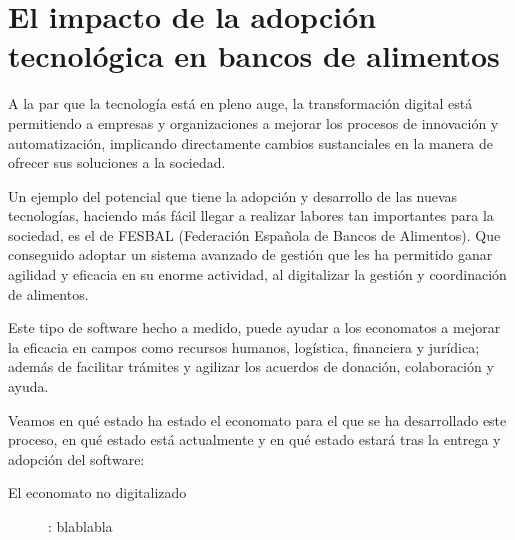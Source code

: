 \section{El impacto de la adopción tecnológica en bancos de alimentos}
A la par que la tecnología está en pleno auge, la transformación digital está permitiendo a empresas y organizaciones a mejorar los procesos de innovación y automatización, implicando directamente cambios sustanciales en la manera de ofrecer sus soluciones a la sociedad.
\vspace{1em}
\par Un ejemplo del potencial que tiene la adopción y desarrollo de las nuevas tecnologías, haciendo más fácil llegar a realizar labores tan importantes para la sociedad, es el de FESBAL (Federación Española de Bancos de Alimentos). Que conseguido adoptar un sistema avanzado de gestión que les ha permitido ganar agilidad y eficacia en su enorme actividad, al digitalizar la gestión y coordinación de alimentos.
\vspace{1em}
\par Este tipo de software hecho a medido, puede ayudar a los economatos a mejorar la eficacia en campos como recursos humanos, logística, financiera y jurídica; además de facilitar trámites y agilizar los acuerdos de donación, colaboración y ayuda.
\vspace{1em}
\par Veamos en qué estado ha estado el economato para el que se ha desarrollado este proceso, en qué estado está actualmente y en qué estado estará tras la entrega y adopción del software:
\begin{description}
  \item[El economato no digitalizado]: blablabla
\end{description}
\clearpage
